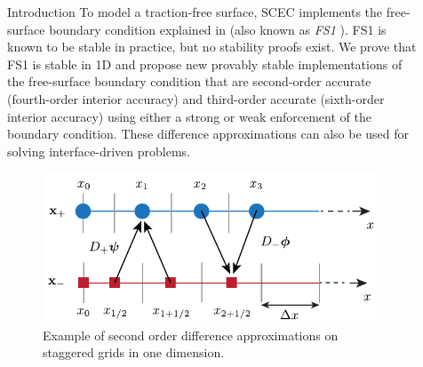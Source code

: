 \documentclass[final]{beamer}
\newlength{\sepwid}
\newlength{\onecolwid}
\newlength{\twocolwid}
\begin{document}
\begin{frame}[t]
\begin{columns}[t]
\begin{column}{\onecolwid}
\begin{block}{Introduction}
To model a traction-free surface, SCEC implements the free-surface boundary condition explained in
\cite{levander1988fourth,graves1996simulating,gottschammer2001accuracy} (also known as
\emph{FS1} \cite{gottschammer2001accuracy}).
FS1 is known to be stable in practice, but no stability proofs exist. We prove that FS1 is stable in 1D and propose new
provably stable implementations of the
free-surface boundary condition that are second-order accurate (fourth-order interior accuracy) and third-order
accurate (sixth-order interior accuracy) using either a strong or weak enforcement of
the boundary condition. These difference approximations can also be used for solving interface-driven problems.
\end{block}


 \begin{figure}
\includegraphics[width=\linewidth]{figures/difference_operators.pdf}
\caption{Example of second order difference approximations on staggered grids in one dimension.}
\label{fig:grids}
\end{figure}
              


\end{column} %

\begin{column}{\sepwid}\end{column} %

\begin{column}{\twocolwid} %

\begin{columns}[t,totalwidth=\twocolwid] %

\begin{column}{\onecolwid}\vspace{-.6in} %


\end{column}
\end{columns}
\end{column}
\end{columns}
\end{frame}
\end{document}
